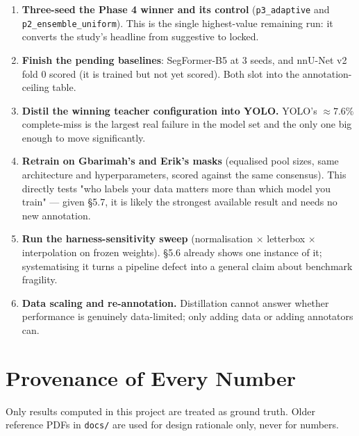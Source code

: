\documentclass[11pt]{article}
\begin{document}
\begin{enumerate}[leftmargin=1.6em,itemsep=3pt]
  \item \textbf{Three-seed the Phase 4 winner and its control} (\texttt{p3\_adaptive} and
  \texttt{p2\_ensemble\_\allowbreak uniform}). This is the single highest-value remaining run: it converts the
  study's headline from suggestive to locked.
  \item \textbf{Finish the pending baselines}: SegFormer-B5 at 3 seeds, and nnU-Net v2 fold 0
  scored (it is trained but not yet scored). Both slot into the annotation-ceiling table.
  \item \textbf{Distil the winning teacher configuration into YOLO.} YOLO's $\approx7.6\%$
  complete-miss is the largest real failure in the model set and the only one big enough to move
  significantly.
  \item \textbf{Retrain on Gbarimah's and Erik's masks} (equalised pool sizes, same architecture
  and hyperparameters, scored against the same consensus). This directly tests "who labels your
  data matters more than which model you train" --- given \S5.7, it is likely the strongest
  available result and needs no new annotation.
  \item \textbf{Run the harness-sensitivity sweep} (normalisation $\times$ letterbox $\times$
  interpolation on frozen weights). \S5.6 already shows one instance of it; systematising it turns
  a pipeline defect into a general claim about benchmark fragility.
  \item \textbf{Data scaling and re-annotation.} Distillation cannot answer whether performance is
  genuinely data-limited; only adding data or adding annotators can.
\end{enumerate}

\appendix
\section{Provenance of Every Number}

Only results computed in this project are treated as ground truth. Older reference PDFs in
\texttt{docs/} are used for design rationale only, never for numbers.
\end{document}

